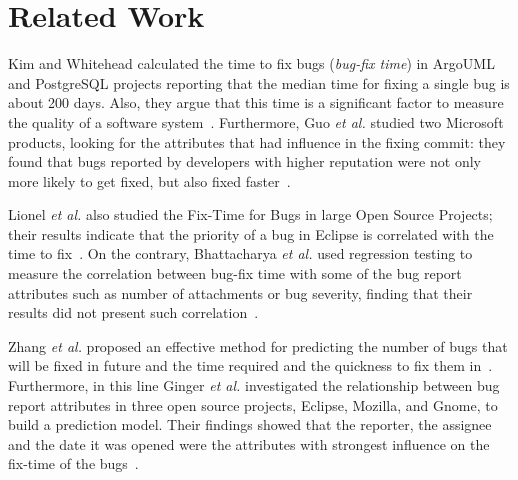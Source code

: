 \documentclass[10pt, conference]{IEEEtran}
\begin{document}
\section{Related Work}
\label{sec:relatedwork}


Kim and Whitehead calculated the time to fix bugs (\emph{bug-fix time}) in ArgoUML and PostgreSQL projects reporting that the median time for fixing a single bug is about 200 days. Also, they argue that this time is a significant factor to measure the quality of a software system~\cite{kim2006long}. Furthermore, Guo \emph{et al.} studied two Microsoft products, looking for the attributes that had influence in the fixing commit: they found that bugs reported by developers with higher reputation were not only more likely to get fixed, but also fixed faster~\cite{guo2010characterizing}.

Lionel \emph{et al.} also studied the Fix-Time for Bugs in large Open Source Projects; their results indicate that the priority of a bug in Eclipse is correlated with the time to fix~\cite{marks2011studying}. On the contrary, Bhattacharya \emph{et al.} used regression testing to measure the correlation between bug-fix time with some of the bug report attributes such as number of attachments or bug severity, finding that their results did not present such correlation~\cite{bhattacharya2011bug}.



Zhang \emph{et al.} proposed an effective method for predicting the number of bugs that will be fixed in future and the time required and the quickness to fix them in~\cite{zhang2013predicting}. Furthermore, in this line Ginger \emph{et al.} investigated the relationship between bug report attributes in three open source projects, Eclipse, Mozilla, and Gnome, to build a prediction model. Their findings showed that the reporter, the assignee and the date it was opened were the attributes with strongest influence on the fix-time of the bugs~\cite{giger2010predicting}.
\end{document}
